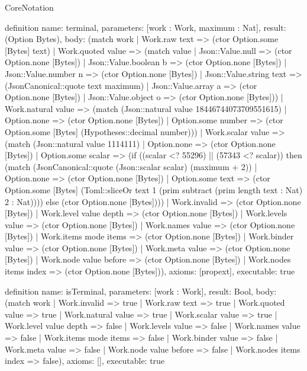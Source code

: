\begin{lexlean}{CoreNotation}
\begin{semanticmodule}
definition{
 name: terminal,
 parameters: [work : Work, maximum : Nat],
 result: (Option Bytes),
 body: (match work | Work.raw text => (ctor Option.some [Bytes] text) | Work.quoted value => (match value | Json::Value.null => (ctor Option.none [Bytes]) | Json::Value.boolean b => (ctor Option.none [Bytes]) | Json::Value.number n => (ctor Option.none [Bytes]) | Json::Value.string text => (JsonCanonical::quote text maximum) | Json::Value.array a => (ctor Option.none [Bytes]) | Json::Value.object o => (ctor Option.none [Bytes])) | Work.natural value => (match (Json::natural value 18446744073709551615) | Option.none => (ctor Option.none [Bytes]) | Option.some number => (ctor Option.some [Bytes] (Hypotheses::decimal number))) | Work.scalar value => (match (Json::natural value 1114111) | Option.none => (ctor Option.none [Bytes]) | Option.some scalar => (if ((scalar <? 55296) || (57343 <? scalar)) then (match (JsonCanonical::quote (Json::scalar scalar) (maximum + 2)) | Option.none => (ctor Option.none [Bytes]) | Option.some text => (ctor Option.some [Bytes] (Toml::sliceOr text 1 (prim subtract (prim length text : Nat) 2 : Nat)))) else (ctor Option.none [Bytes]))) | Work.invalid => (ctor Option.none [Bytes])  | Work.level value depth => (ctor Option.none [Bytes])  | Work.levels value => (ctor Option.none [Bytes])  | Work.names value => (ctor Option.none [Bytes])  | Work.items mode items => (ctor Option.none [Bytes])  | Work.binder value => (ctor Option.none [Bytes])  | Work.meta value => (ctor Option.none [Bytes])  | Work.node value before => (ctor Option.none [Bytes])  | Work.nodes items index => (ctor Option.none [Bytes])),
 axioms: [propext],
 executable: true
}

definition{
 name: isTerminal,
 parameters: [work : Work],
 result: Bool,
 body: (match work | Work.invalid => true | Work.raw text => true | Work.quoted value => true | Work.natural value => true | Work.scalar value => true | Work.level value depth => false | Work.levels value => false | Work.names value => false | Work.items mode items => false | Work.binder value => false | Work.meta value => false | Work.node value before => false | Work.nodes items index => false),
 axioms: [],
 executable: true
}


\end{semanticmodule}
\end{lexlean}
